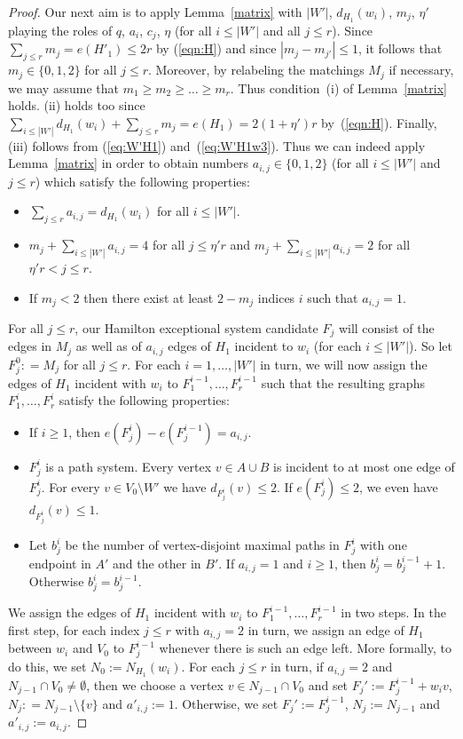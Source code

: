 \documentclass{memo-l}
\numberwithin{section}{chapter}
\numberwithin{equation}{section}
\numberwithin{firstthm}{section}
\numberwithin{figure}{section}
\begin{document}
{\begin{proof}
Our next aim is to apply Lemma~\ref{matrix} with $|W'|$, $d_{H_1}(w_i)$, $m_j$, $\eta'$ playing the roles of $q$, $a_i$, $c_j$, $\eta$
(for all $i\le |W'|$ and all $j \le r$). Since $\sum_{j\le r} m_j=e(H'_1)\le 2r$ by (\ref{eqn:H}) and since
$| m_j- m_{j'}| \le 1$, it follows that $m_j\in \{0,1,2\}$ for all $j\le r$.
Moreover, by relabeling the matchings $M_j$ if necessary, we may assume that $m_1 \ge m_2 \ge \dots \ge m_r$. Thus
condition~(i) of Lemma~\ref{matrix} holds. (ii) holds too since $\sum_{i\le |W'|} d_{H_1}(w_i)+\sum_{j\le r} m_j=e(H_1)=2(1+\eta')r$
by~(\ref{eqn:H}). Finally, (iii) follows from (\ref{eq:W'H1}) and~(\ref{eq:W'H1w3}).
Thus we can indeed apply Lemma~\ref{matrix} in order to obtain numbers $a_{i,j}  \in \{0,1,2\}$ (for all $i \le |W'|$ and $ j \le r $)
which satisfy the following properties:
\begin{itemize}
\item[(a$'$)]	$\sum_{j \le r } a_{i,j} = d_{H_1}(w_i)$ for all $i\le |W'|$.
	\item[(b$'$)]	$ m_j + \sum_{i \le |W'|} a_{i,j} = 4 $ for all $j \le \eta' r$ and
	         $m_j + \sum_{i \le |W'|} a_{i,j} = 2$ for all $\eta' r < j \le  r$.
\item[(c$'$)] 	If $m_j < 2$ then there exist at least $2 - m_j$ indices $i$ such that $a_{i,j} = 1$.
\end{itemize}
For all $j\le r$, our Hamilton exceptional system candidate $F_j$ will consist of the edges in $M_j$
as well as of $a_{i,j}$ edges of $H_1$ incident to $w_i$ (for each $i\le |W'|$).   
So let $F_j^0: = M_j$ for all $j \le r$. For each $i =1,\dots, |W'|$ in turn, we will now assign the edges of $H_1$ incident with $w_i$
to $F_1^{i-1},\dots,F_r^{i-1}$ such that the resulting graphs $F_1^{i},\dots,F_r^{i}$ satisfy the following properties: 
\begin{itemize}
	\item[($\alpha_i$)] If $i \ge 1$, then $e(F_j^i) - e(F_j^{i-1}) = a_{i,j}$.
	\item[($\beta_i$)] $F^i_j$ is a path system. Every vertex $v \in A \cup B$ is incident to at most one edge of $F_j^i$.
For every $v \in V_0 \setminus W'$ we have $d_{F_j^i}(v) \le 2$. If $e(F_j^i) \le 2$, we even have $d_{F_j^i}(v) \le 1$.
    \item[($\gamma_i$)] Let $b_{j}^i$ be the number of vertex-disjoint maximal paths in $F_j^i$ with one endpoint in $A'$ and the other in $B'$.
If $a_{i,j}=1$ and $i \ge 1$, then $b_j^i = b_j^{i-1}+1$. Otherwise $b_j^i = b_j^{i-1}$. 
\end{itemize}
We assign the edges of $H_1$ incident with $w_i$ to $F_1^{i-1},\dots,F_r^{i-1}$ in two steps.
In the first step, for each index $j\le r$ with $a_{i,j}=2$ in turn, we assign an edge of $H_1$ between $w_i$ and $V_0$ to
$F_j^{i-1}$ whenever there is such an edge left. More formally, to do this, we set $N_0 := N_{H_1}(w_i)$.
For each $j \le r$ in turn, if $a_{i,j} = 2$ and $N_{j-1} \cap V_0 \ne \emptyset$, then we choose a vertex
$v \in N_{j-1} \cap V_0$ and set $F_j':= F_j^{i-1} + w_i v$, $N_j: = N_{j-1} \setminus \{v\}$ and $a'_{i,j} := 1$.
Otherwise, we set $F_j':= F_j^{i-1}$, $N_j:= N_{j-1}$ and $a'_{i,j} := a_{i,j}$.


\end{proof}}
\end{document}
